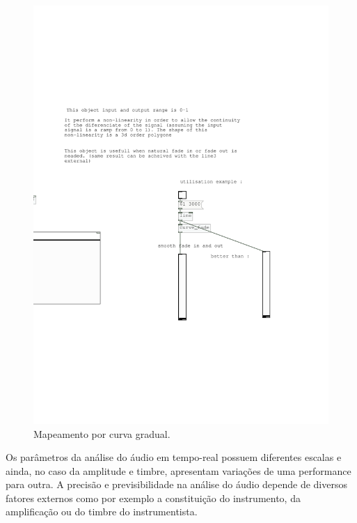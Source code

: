 \documentclass{ppgmus}
\begin{document}
\begin{figure}
\includegraphics[scale=.6]{mapping3}
\caption{Mapeamento por curva gradual.}
\label{mapping3}
\end{figure}

Os parâmetros da análise do áudio em tempo-real possuem diferentes
escalas e ainda, no caso da amplitude e timbre, apresentam variações de uma
performance para outra. A precisão e previsibilidade na análise do áudio 
depende de diversos fatores externos como por exemplo a constituição do instrumento, da
amplificação ou do timbre do instrumentista.
\end{document}
